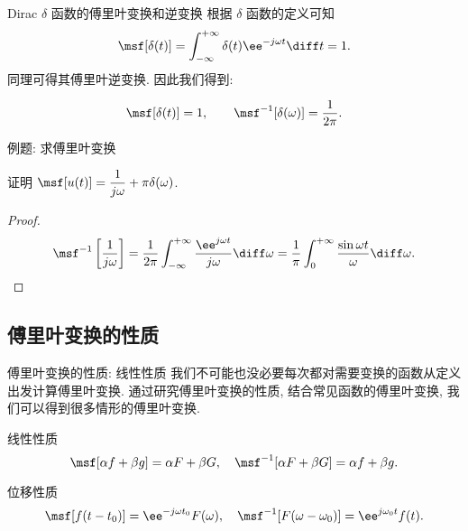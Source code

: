 \begin{frame}{Dirac $\delta$ 函数的傅里叶变换和逆变换}
	\onslide<+->
	根据 $\delta$ 函数的定义可知
	\[\msf[\delta(t)]=\int_{-\infty}^{+\infty}\delta(t)\ee^{-j\omega t}\diff t=1.
	\]
	\onslide<+->
	同理可得其傅里叶逆变换.
	\onslide<+->
	因此我们得到:
	\begin{theorem*}[][]%
	\[
		\msf[\delta(t)]=1,\qquad
		\msf^{-1}[\delta(\omega)]=\dfrac1{2\pi}.
	\]
	\end{theorem*}
\end{frame}


\begin{frame}{例题: 求傅里叶变换}
	\onslide<+->
	\begin{example}
		证明 \alert{$\msf[u(t)]=\dfrac1{j\omega}+\pi\delta(\omega)$}.
	\end{example}

	\onslide<+->
	\begin{proof}
			\[\msf^{-1}\left[\frac1{j\omega}\right]
			=\frac1{2\pi}\int_{-\infty}^{+\infty}\frac{\ee^{j\omega t}}{j\omega} \diff\omega
			=\frac1\pi\int_0^{+\infty}\frac{\sin\omega t}{\omega} \diff\omega.
	\]
		\onslide<+->{故
			\[\msf^{-1} \left[\frac1{j\omega}+\pi\delta(\omega)\right]
			=\half\sgn(t)+\half =u(t)\quad (t\neq 0).\qedhere
	\]
		}
	\end{proof}
\end{frame}


\subsection{傅里叶变换的性质}


\begin{frame}{傅里叶变换的性质: 线性性质}
	\onslide<+->
	我们不可能也没必要每次都对需要变换的函数从定义出发计算傅里叶变换.
	\onslide<+->
	通过研究傅里叶变换的性质, 结合常见函数的傅里叶变换, 我们可以得到很多情形的傅里叶变换.

	\onslide<+->
	\begin{main}{线性性质}
	\[
		\msf[\alpha f+\beta g]=\alpha F+\beta G,\quad
		\msf^{-1}[\alpha F+\beta G]=\alpha f+\beta g.
	\]
	\end{main}

	\onslide<+->
	\begin{main}{位移性质}
	\[
		\msf[f(t-t_0)]=\ee^{-j\omega t_0}F(\omega),\quad
		\msf^{-1}[F(\omega-\omega_0)]=\ee^{j\omega_0 t}f(t).
	\]
		\bigdel
	\end{main}
\end{frame}


